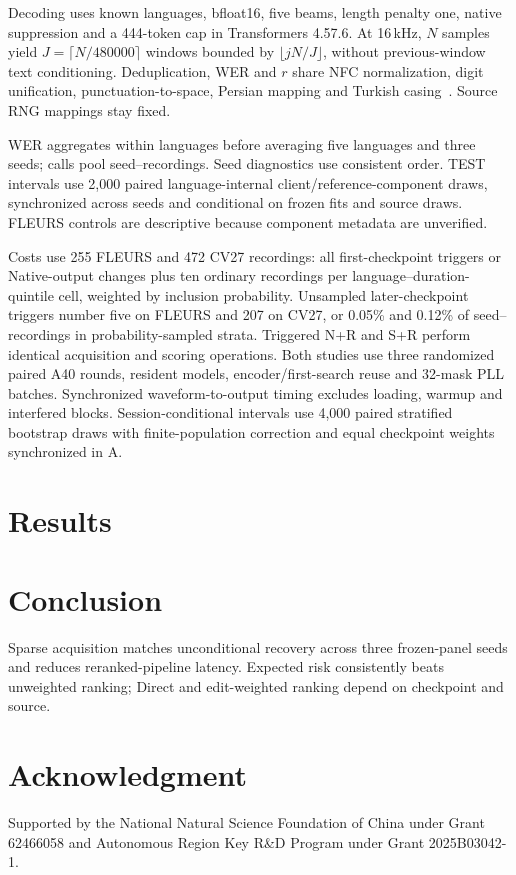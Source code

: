 \documentclass[conference,letterpaper]{IEEEtran}
\begin{document}
Decoding uses known languages, bfloat16, five beams, length penalty one, native suppression and a 444-token cap in Transformers 4.57.6. At 16\,kHz, $N$ samples yield $J=\lceil N/480000\rceil$ windows bounded by $\lfloor jN/J\rfloor$, without previous-window text conditioning.
Deduplication, WER and $r$ share NFC normalization, digit unification, punctuation-to-space, Persian mapping and Turkish casing~\cite{normalization}. Source RNG mappings stay fixed.

\begin{samepage}
WER aggregates within languages before averaging five languages and three seeds; calls pool seed--recordings. Seed diagnostics use consistent order. TEST intervals use 2,000 paired language-internal client/reference-component draws, synchronized across seeds and conditional on frozen fits and source draws. FLEURS controls are descriptive because component metadata are unverified.\par
\end{samepage}

Costs use 255 FLEURS and 472 CV27 recordings: all first-checkpoint triggers or Native-output changes plus ten ordinary recordings per language--duration-quintile cell, weighted by inclusion probability. Unsampled later-checkpoint triggers number five on FLEURS and 207 on CV27, or 0.05\% and 0.12\% of seed--recordings in probability-sampled strata. Triggered N+R and S+R perform identical acquisition and scoring operations. Both studies use three randomized paired A40 rounds, resident models, encoder/first-search reuse and 32-mask PLL batches. Synchronized waveform-to-output timing excludes loading, warmup and interfered blocks. Session-conditional intervals use 4,000 paired stratified bootstrap draws with finite-population correction and equal checkpoint weights synchronized in A.

\section{Results}

\section{Conclusion}
Sparse acquisition matches unconditional recovery across three frozen-panel seeds and reduces reranked-pipeline latency. Expected risk consistently beats unweighted ranking; Direct and edit-weighted ranking depend on checkpoint and source.
\section*{Acknowledgment}
Supported by the National Natural Science Foundation of China under Grant 62466058 and Autonomous Region Key R\&D Program under Grant 2025B03042-1.
\label{iscas:body-end}\clearpage\raggedbottom\balance
\label{iscas:references-start}

\end{document}
